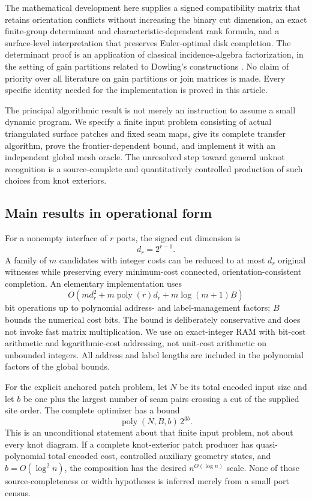 \documentclass[11pt,letterpaper]{article}
\theoremstyle{definition}
\newcommand{\poly}{\operatorname{poly}}
\begin{document}
The mathematical development here supplies a signed compatibility matrix that retains orientation conflicts without increasing the binary cut dimension, an exact finite-group determinant and characteristic-dependent rank formula, and a surface-level interpretation that preserves Euler-optimal disk completion. The determinant proof is an application of classical incidence-algebra factorization, in the setting of gain partitions related to Dowling's constructions \cite{dowling,lindstrom}. No claim of priority over all literature on gain partitions or join matrices is made. Every specific identity needed for the implementation is proved in this article.

The principal algorithmic result is not merely an instruction to assume a small dynamic program. We specify a finite input problem consisting of actual triangulated surface patches and fixed seam maps, give its complete transfer algorithm, prove the frontier-dependent bound, and implement it with an independent global mesh oracle. The unresolved step toward general unknot recognition is a source-complete and quantitatively controlled production of such choices from knot exteriors.

\subsection{Main results in operational form}
For a nonempty interface of $r$ ports, the signed cut dimension is
\begin{equation}\label{eq:dimension}
 d_r=2^{r-1}.
\end{equation}
A family of $m$ candidates with integer costs can be reduced to at most $d_r$ original witnesses while preserving every minimum-cost connected, orientation-consistent completion. An elementary implementation uses
\begin{equation}\label{eq:local-summary}
 O\!\left(m d_r^2+m\poly(r)d_r+m\log(m+1)B\right)
\end{equation}
bit operations up to polynomial address- and label-management factors; $B$ bounds the numerical cost bits. The bound is deliberately conservative and does not invoke fast matrix multiplication. We use an exact-integer RAM with bit-cost arithmetic and logarithmic-cost addressing, not unit-cost arithmetic on unbounded integers. All address and label lengths are included in the polynomial factors of the global bounds.

For the explicit anchored patch problem, let $N$ be its total encoded input size and let $b$ be one plus the largest number of seam pairs crossing a cut of the supplied site order. The complete optimizer has a bound
\begin{equation}\label{eq:patch-summary}
 \poly(N,B,b)\,2^{3b}.
\end{equation}
This is an unconditional statement about that finite input problem, not about every knot diagram. If a complete knot-exterior patch producer has quasi-polynomial total encoded cost, controlled auxiliary geometry states, and $b=O(\log^2 n)$, the composition has the desired $n^{O(\log n)}$ scale. None of those source-completeness or width hypotheses is inferred merely from a small port census.
\end{document}
